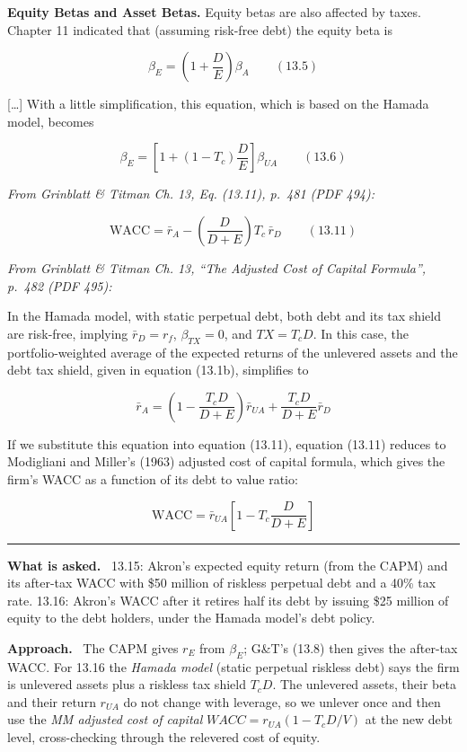 \documentclass[11pt,a4paper]{article}
\numberwithin{equation}{section}
\newcommand{\asked}{\par\medskip\noindent\textbf{What is asked.}~}
\newcommand{\approach}{\par\smallskip\noindent\textbf{Approach.}~}
\newcommand{\stmtend}{\par\endgroup\nopagebreak\noindent\rule{\linewidth}{0.4pt}\par\medskip}
\begin{document}
\textbf{Equity Betas and Asset Betas.} Equity betas are also affected by taxes. Chapter 11 indicated
that (assuming risk-free debt) the equity beta is

\[\beta_E = \left(1 + \frac{D}{E}\right)\beta_A \qquad (13.5)\]

{[}\ldots{]} With a little simplification, this equation, which is based on the Hamada model,
becomes

\[\beta_E = \left[1 + (1 - T_c)\frac{D}{E}\right]\beta_{UA} \qquad (13.6)\]

\emph{From Grinblatt \& Titman Ch. 13, Eq. (13.11), p.~481 (PDF 494):}

\[\text{WACC} = \bar r_A - \left(\frac{D}{D + E}\right) T_c\, \bar r_D \qquad (13.11)\]

\emph{From Grinblatt \& Titman Ch. 13, ``The Adjusted Cost of Capital Formula'', p.~482 (PDF 495):}

In the Hamada model, with static perpetual debt, both debt and its tax shield are risk-free,
implying \(\bar r_D = r_f\), \(\beta_{TX} = 0\), and \(TX = T_c D\). In this case, the
portfolio-weighted average of the expected returns of the unlevered assets and the debt tax shield,
given in equation (13.1b), simplifies to

\[\bar r_A = \left(1 - \frac{T_c D}{D + E}\right)\bar r_{UA} + \frac{T_c D}{D + E}\bar r_D\]

If we substitute this equation into equation (13.11), equation (13.11) reduces to Modigliani and
Miller's (1963) adjusted cost of capital formula, which gives the firm's WACC as a function of its
debt to value ratio:

\[\text{WACC} = \bar r_{UA}\left[1 - T_c \frac{D}{D + E}\right]\]
\stmtend

\asked
13.15: Akron's expected equity return (from the CAPM) and its after-tax WACC with \$50 million
of riskless perpetual debt and a 40\% tax rate.
13.16: Akron's WACC after it retires half its debt by issuing \$25 million of equity to the
debt holders, under the Hamada model's debt policy.

\approach
The CAPM gives $r_E$ from $\beta_E$; G\&T's (13.8) then gives the after-tax WACC. For 13.16 the
\emph{Hamada model} (static perpetual riskless debt) says the firm is unlevered assets plus a
riskless tax shield $T_cD$. The unlevered assets, their beta and their return $r_{UA}$ do not
change with leverage, so we unlever once and then use the \emph{MM adjusted cost of capital}
$\mathit{WACC}=r_{UA}(1-T_cD/V)$ at the new debt level, cross-checking through the relevered
cost of equity.
\end{document}
